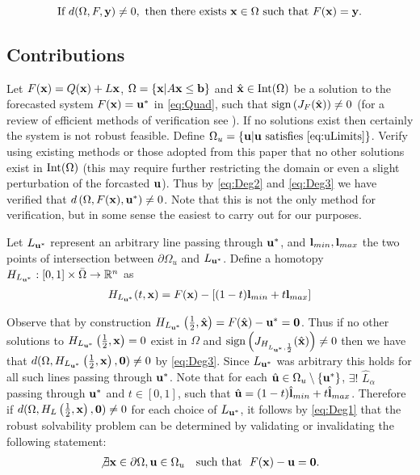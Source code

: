\begin{equation}\label{eq:Deg2}
\text{If }d(\Omega,F,\mathbf{y})\neq 0,\text{ then there exists }\mathbf{x}\in\Omega\text{ such that }F(\mathbf{x})=\mathbf{y}. 
\end{equation}

\subsection{Contributions}
Let $F(\mathbf{x})=Q(\mathbf{x})+L\mathbf{x}$, $\Omega=\{\mathbf{x}| A\mathbf{x} \leq \mathbf{b}\}$ and $\hat{\mathbf{x}}\in \operatorname{Int}(\Omega)$ be a solution to the forecasted system $F(\mathbf{x})=\mathbf{u}^*$ in \ref{eq:Quad}, such that $\operatorname{sign}\left(J_{F}(\hat{\mathbf{x}})\right)\neq 0$ (for a review of efficient methods of verification see \cite{GRIEWANK2014}). 
If no solutions exist then certainly the system is not robust feasible. Define $\Omega_u=\{\mathbf{u}| \mathbf{u}\text{ satisfies }\ref{eq:uLimits}\}$.
Verify using existing methods or those adopted from this paper that no other solutions exist in $\operatorname{Int}(\Omega)$ (this may require further restricting the domain or even a slight perturbation of the forcasted $\mathbf{u}$). 
Thus by \ref{eq:Deg2} and \ref{eq:Deg3} we have verified that $d\left(\Omega, F(\mathbf{x}), \mathbf{u}^*\right)\neq 0$. 
Note that this is not the only method for verification, but in some sense the easiest to carry out for our purposes. 

Let $L_{\mathbf{u}^*}$ represent an arbitrary line passing through $\mathbf{u}^*$, and $\mathbf{l}_{min},\mathbf{l}_{max}$ the two points of intersection between $\partial\Omega_u$ and $L_{\mathbf{u}^*}$. 
Define a homotopy $H_{L_{\mathbf{u}^*}} : [0,1]\times\bar{\Omega}\rightarrow\mathbb{R}^n$ as 
\begin{align}
H_{L_{\mathbf{u}^*}}(t,\mathbf{x}) = F(\mathbf{x})-\left[(1-t)\mathbf{l}_{min}+t\mathbf{l}_{max}\right] \label{eq:Homo}
\end{align}

Observe that by construction $H_{L_{\mathbf{u}^*}}\left(\frac{1}{2},\hat{\mathbf{x}}\right)=F(\hat{\mathbf{x}})-\mathbf{u}^*=\textbf{0}$. 
Thus if no other solutions to $H_{L_{\mathbf{u}^*}}\left(\frac{1}{2},\mathbf{x}\right)=0$ exist in $\Omega$ and $\operatorname{sign}\left(J_{H_{L_{\mathbf{u}^*},\frac{1}{2}}}(\hat{\mathbf{x}})\right)\neq 0$ then we have that $d(\Omega,H_{L_{\mathbf{u}^*}}\left(\frac{1}{2},\mathbf{x}\right),\textbf{0})\neq 0$ by \ref{eq:Deg3}. 
Since $L_{\mathbf{u}^*}$ was arbitrary this holds for all such lines passing through $\mathbf{u}^*$.
Note that for each $\hat{\mathbf{u}}\in\Omega_u\setminus\{\mathbf{u}^*\}$, $\exists !$ $\hat{L}_{\alpha}$ passing through $\mathbf{u}^*$ and $t\in[0,1]$,  such that $\hat{\mathbf{u}}=(1-t)\hat{\mathbf{l}}_{min}+t\hat{\mathbf{l}}_{max}$. 
Therefore if $d(\Omega,H_L\left(\frac{1}{2},\mathbf{x}\right),\mathbf{0})\neq 0$ for each choice of $L_{\mathbf{u}^*}$, it follows by \ref{eq:Deg1} that the robust solvability problem can be determined by validating or invalidating the following statement:
\begin{align}
\not\exists \mathbf{x}\in\partial\Omega, \mathbf{u}\in\Omega_u \ \ \mbox{ such that } \ F(\mathbf{x})-\mathbf{u}=\mathbf{0}. \label{eq:RSForm}
\end{align}

